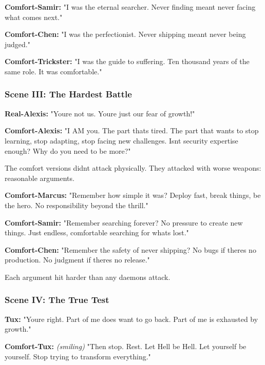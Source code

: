 \textbf{Comfort-Samir:} "I was the eternal searcher. Never finding meant never facing what comes next."

\textbf{Comfort-Chen:} "I was the perfectionist. Never shipping meant never being judged."

\textbf{Comfort-Trickster:} "I was the guide to suffering. Ten thousand years of the same role. It was comfortable."

\bookdivider

\subsubsection{Scene III: The Hardest Battle}\label{scene-iii-the-hardest-battle}

\textbf{Real-Alexis:} "You\textquotesingle re not us. You\textquotesingle re just our fear of growth!"

\textbf{Comfort-Alexis:} "I AM you. The part that\textquotesingle s tired. The part that wants to stop learning, stop adapting, stop facing new challenges. Isn\textquotesingle t security expertise enough? Why do you need to be more?"

The comfort versions didn\textquotesingle t attack physically. They attacked with worse weapons: reasonable arguments.

\textbf{Comfort-Marcus:} "Remember how simple it was? Deploy fast, break things, be the hero. No responsibility beyond the thrill."

\textbf{Comfort-Samir:} "Remember searching forever? No pressure to create new things. Just endless, comfortable searching for what\textquotesingle s lost."

\textbf{Comfort-Chen:} "Remember the safety of never shipping? No bugs if there\textquotesingle s no production. No judgment if there\textquotesingle s no release."

Each argument hit harder than any daemon\textquotesingle s attack.

\bookdivider

\subsubsection{Scene IV: The True Test}\label{scene-iv-the-true-test}

\textbf{Tux:} "You\textquotesingle re right. Part of me does want to go back. Part of me is exhausted by growth."

\textbf{Comfort-Tux:} \emph{(smiling)} "Then stop. Rest. Let Hell be Hell. Let yourself be yourself. Stop trying to transform everything."

